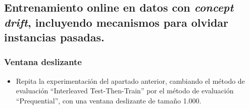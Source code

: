 \documentclass[11pt]{article}
\begin{document}
\subsection{Entrenamiento online en datos con \emph{concept drift}, incluyendo mecanismos para olvidar instancias pasadas.}
\label{sec:org8db1e6b}

\subsubsection{Ventana deslizante}
\label{sec:org1f5439e}
\begin{itemize}
\item Repita la experimentación del apartado anterior, cambiando el método
de evaluación “Interleaved Test-Then-Train” por el método de
evaluación “Prequential”, con una ventana deslizante de tamaño 1.000.
\end{itemize}
\end{document}
